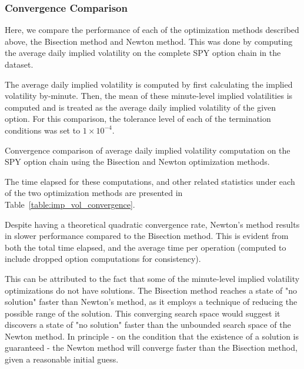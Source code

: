 \documentclass[10pt]{article}
\begin{document}
        \subsubsection{Convergence Comparison}

        Here, we compare the performance of each of the optimization methods described above, the Bisection method and Newton method. This was done by computing the average daily implied volatility on the complete SPY option chain in the dataset.

        The average daily implied volatility is computed by first calculating the implied volatility by-minute. Then, the mean of these minute-level implied volatilities is computed and is treated as the average daily implied volatility of the given option. For this comparison, the tolerance level of each of the termination conditions was set to $1 \times 10^{-4}$.
        
        \begin{table}
            \centering
            \caption{Convergence comparison of average daily implied volatility computation on the SPY option chain using the Bisection and Newton optimization methods.}
            \label{table:imp_vol_convergence}
        \end{table}

        The time elapsed for these computations, and other related statistics under each of the two optimization methods are presented in Table~\ref{table:imp_vol_convergence}.

        Despite having a theoretical quadratic convergence rate, Newton's method results in slower performance compared to the Bisection method. This is evident from both the total time elapsed, and the average time per operation (computed to include dropped option computations for consistency). 
        
        This can be attributed to the fact that some of the minute-level implied volatility optimizations do not have solutions. The Bisection method reaches a state of "no solution" faster than Newton's method, as it employs a technique of reducing the possible range of the solution. This converging search space would suggest it discovers a state of "no solution" faster than the unbounded search space of the Newton method. In principle - on the condition that the existence of a solution is guaranteed - the Newton method will converge faster than the Bisection method, given a reasonable initial guess.
\end{document}
